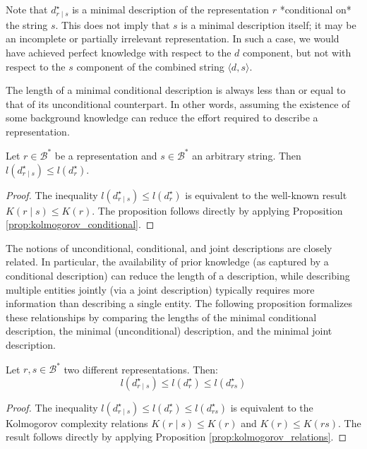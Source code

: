 Note that $d^\star_{r \mid s}$ is a minimal description of the representation $r$ *conditional on* the string $s$. This does not imply that $s$ is a minimal description itself; it may be an incomplete or partially irrelevant representation. In such a case, we would have achieved perfect knowledge with respect to the $d$ component, but not with respect to the $s$ component of the combined string $\langle d, s \rangle$.

The length of a minimal conditional description is always less than or equal to that of its unconditional counterpart. In other words, assuming the existence of some background knowledge can reduce the effort required to describe a representation.

\begin{proposition}
\label{prop:description_conditional_inequality}
Let $r \in \mathcal{B}^\ast$ be a representation and $s \in \mathcal{B}^\ast$ an arbitrary string. Then $l \left( d^\star_{r \mid s} \right) \leq l \left( d^\star_r \right)$.
\end{proposition}
\begin{proof}
The inequality $l \left( d^\star_{r \mid s} \right) \leq l \left( d^\star_r \right)$ is equivalent to the well-known result $K(r \mid s) \leq K(r)$. The proposition follows directly by applying Proposition \ref{prop:kolmogorov_conditional}.
\end{proof}

The notions of unconditional, conditional, and joint descriptions are closely related. In particular, the availability of prior knowledge (as captured by a conditional description) can reduce the length of a description, while describing multiple entities jointly (via a joint description) typically requires more information than describing a single entity. The following proposition formalizes these relationships by comparing the lengths of the minimal conditional description, the minimal (unconditional) description, and the minimal joint description.

\begin{proposition}
\label{prop:description_conditional_joint}
Let $r, s \in \mathcal{B}^\ast$ two different representations. Then:
\[
l \left( d^\star_{r \mid s} \right) \leq l \left( d^\star_r \right) \leq l \left( d^\star_{rs} \right)
\]
\end{proposition}
\begin{proof}
The inequality $l \left( d^\star_{r \mid s} \right) \leq l \left( d^\star_r \right) \leq l \left( d^\star_{rs} \right)$ is equivalent to the Kolmogorov complexity relations $K(r \mid s) \leq K(r)$ and $K(r) \leq K(rs)$. The result follows directly by applying Proposition \ref{prop:kolmogorov_relations}.
\end{proof}

